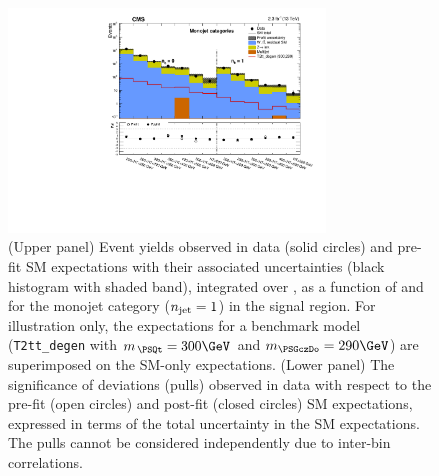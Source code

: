 \begin{figure}[!thb]
  \centering
    \includegraphics[width=0.75\textwidth]{Figure_003.pdf}
    \caption{(Upper panel) Event yields observed in data (solid
      circles) and pre-fit SM expectations with their associated
      uncertainties (black histogram with shaded band), integrated
      over \HTmiss, as a function of \nb and \scalht for the monojet
      category ($n_{\text{jet}} = 1$) in the signal region. For illustration
      only, the expectations for a benchmark model
      (\texttt{T2tt\_degen} with $m_{\,\PSQt} = 300\GeV$ and
      $m_{\PSGczDo} = 290\GeV$) are superimposed on the SM-only
      expectations. (Lower panel) The significance of deviations
      (pulls) observed in data with respect to the pre-fit (open
      circles) and post-fit (closed circles) SM expectations,
      expressed in terms of the total uncertainty in the SM
      expectations. The pulls cannot be considered independently due
      to inter-bin correlations.}
    \label{fig:mono}
\end{figure}

